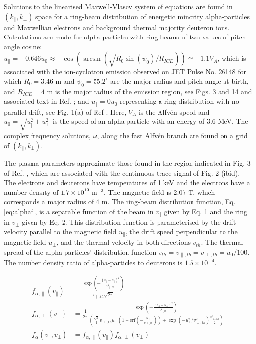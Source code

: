 \documentclass[12pt]{iopart}
\begin{document}
Solutions to the linearised Maxwell-Vlasov system of equations are found in
$(k_\parallel, k_\bot)$ space for a ring-beam distribution of energetic minority
alpha-particles and Maxwellian electrons and background thermal majority
deuteron ions. Calculations are made for alpha-particles with ring-beams of two
values of pitch-angle cosine: $u_\parallel=-0.646 u_0 \approx
-\cos(\arcsin(\sqrt{R_0 \sin(\psi_0)/R_{ICE}})) \simeq -1.1 V_A$, which is
associated with the ion-cyclotron emission observed on JET Pulse No. 26148 for
which $R_0=3.46$ m and
$\psi_0=55.2^\circ$ are the major radius and pitch angle at birth, and
$R_{ICE}=4$ m is the major radius of the emission region, see
Figs. 3 and 14 and associated text in Ref. \cite{Cottrell1993}; and
$u_\parallel=0 u_0$ representing a ring distribution with no parallel drift, see
Fig. 1(a) of Ref \cite{Cook2013}. Here, $V_A$ is the Alfv{\'en} speed and $u_0=\sqrt{u_\parallel^2 + u_\perp^2}$ is
the speed of an alpha-particle with an energy of 3.6 MeV. The complex frequency
solutions, $\omega$, along the fast Alfv{\'e}n branch are found on a grid of $(k_\parallel, k_\bot)$.

The plasma parameters approximate those found in the region indicated in Fig. 3
of Ref. \cite{Cottrell1993}, which are associated with the continuous trace
signal of Fig. 2 (ibid). The electrons and deuterons have temperatures of 1 keV and the electrons have a number density
of $1.7\times 10^{19}$ $\mathrm{m^{-3}}$. The magnetic field is $2.07$
$\mathrm{T}$, which corresponds a major radius of $4$ m.
The ring-beam distribution function, Eq. \ref{eq:alphaf}, is a separable
function of the beam in $v_\parallel$ given by Eq. 1 and the ring in $v_\perp$
given by Eq. 2. This distribution function is parameterised by the drift 
velocity parallel to the magnetic field $u_\parallel$, the drift speed 
perpendicular to the magnetic
field $u_{\perp}$, and the thermal velocity in both directions $v_{th}$. The
thermal spread of the alpha particles' distribution function 
$v_{th}=v_{\parallel,th}=v_{\perp,th}=u_0/100$. The number density
ratio of alpha-particles to deuterons is $1.5\times10^{-4}$.

\begin{align}
f_{\alpha,\parallel}\left(v_\parallel\right) &= \frac{\exp\left(-\frac{(v_\parallel - u_\parallel)^2}{v_{\parallel,th}^2}\right)}{v_{\parallel,th} \sqrt{2 \pi}}\\
f_{\alpha,\perp}\left(v_\perp\right) &= \frac{1}{2\pi}\frac{\exp\left(-\frac{\left(v_\bot - u_\bot\right)^2}{v_{\bot,th}^2}\right)}{\left(\frac{\sqrt \pi}{2} v_{\perp, th} u_\bot (1 - \mathrm{erf}(-\frac{u_\bot}{v_{\perp,th}})) + \exp(-u_\bot^2 / v_{\perp, th}^2) \frac{v_{\perp,th}^2}{2}\right)}\\
f_\alpha\left(v_\parallel, v_\perp\right) &= f_{\alpha,\parallel}\left(v_\parallel\right)f_{\alpha,\perp}\left(v_\perp\right)
    \label{eq:alphaf}
\end{align}
\end{document}
